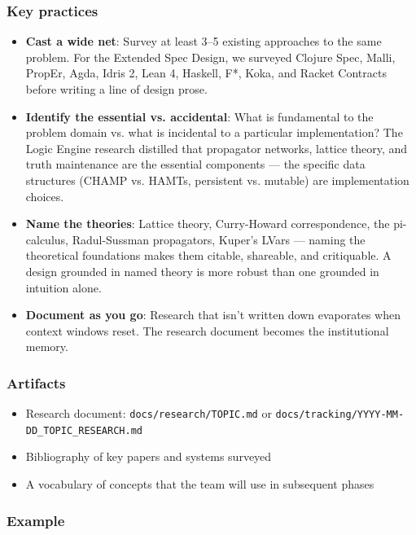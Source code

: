 \documentclass[11pt]{article}
\begin{document}
\subsubsection{Key practices}
\label{sec:orgfef096f}

\begin{itemize}
\item \textbf{Cast a wide net}: Survey at least 3--5 existing approaches to the same
problem. For the Extended Spec Design, we surveyed Clojure Spec, Malli,
PropEr, Agda, Idris 2, Lean 4, Haskell, F*, Koka, and Racket Contracts
before writing a line of design prose.

\item \textbf{Identify the essential vs. accidental}: What is fundamental to the
problem domain vs. what is incidental to a particular implementation?
The Logic Engine research distilled that propagator networks, lattice
theory, and truth maintenance are the essential components --- the
specific data structures (CHAMP vs. HAMTs, persistent vs. mutable)
are implementation choices.

\item \textbf{Name the theories}: Lattice theory, Curry-Howard correspondence,
the pi-calculus, Radul-Sussman propagators, Kuper's LVars --- naming
the theoretical foundations makes them citable, shareable, and
critiquable. A design grounded in named theory is more robust than
one grounded in intuition alone.

\item \textbf{Document as you go}: Research that isn't written down evaporates
when context windows reset. The research document becomes the
institutional memory.
\end{itemize}
\subsubsection{Artifacts}
\label{sec:orgf46db06}

\begin{itemize}
\item Research document: \texttt{docs/research/TOPIC.md} or
\texttt{docs/tracking/YYYY-MM-DD\_TOPIC\_RESEARCH.md}
\item Bibliography of key papers and systems surveyed
\item A vocabulary of concepts that the team will use in subsequent phases
\end{itemize}
\subsubsection{Example}
\label{sec:orgb3fbe5c}
\end{document}
